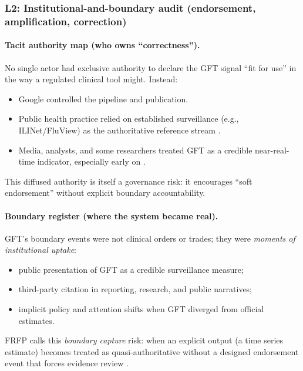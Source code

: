 \subsubsection*{L2: Institutional-and-boundary audit (endorsement, amplification, correction)}

\paragraph{Tacit authority map (who owns “correctness”).}
No single actor had exclusive authority to declare the GFT signal “fit for use” in the way a regulated clinical tool might. Instead:
\begin{itemize}
  \item Google controlled the pipeline and publication.
  \item Public health practice relied on established surveillance (e.g., ILINet/FluView) as the authoritative reference stream \cite{CDCILINetOverview}.
  \item Media, analysts, and some researchers treated GFT as a credible near-real-time indicator, especially early on \cite{Butler2013Nature}.
\end{itemize}
This diffused authority is itself a governance risk: it encourages “soft endorsement” without explicit boundary accountability.

\paragraph{Boundary register (where the system became real).}
GFT’s boundary events were not clinical orders or trades; they were \emph{moments of institutional uptake}:
\begin{itemize}
  \item public presentation of GFT as a credible surveillance measure;
  \item third-party citation in reporting, research, and public narratives;
  \item implicit policy and attention shifts when GFT diverged from official estimates.
\end{itemize}
FRFP calls this \emph{boundary capture} risk: when an explicit output (a time series estimate) becomes treated as quasi-authoritative without a designed endorsement event that forces evidence review \cite{Lazer2014Science}.

